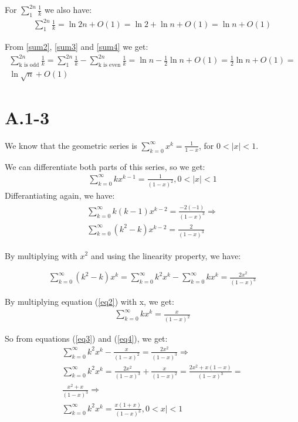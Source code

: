 \documentclass{article}
\begin{document}
For $\sum_{1}^{2n}{\frac{1}{k}}$ we also have:
\begin{gather}
    \sum_{1}^{2n}{\frac{1}{k}} = \ln{2n} + O(1) = \ln{2} + \ln{n} + O(1) = \ln{n} + O(1) \label{sum4}
\end{gather}

From \ref{sum2}, \ref{sum3} and \ref{sum4} we get:
\begin{gather*}
    \sum_{\text{k is odd}}^{2n}{\frac{1}{k}} = \sum_{1}^{2n}{\frac{1}{k}} - \sum_{\text{k is even}}^{2n}{\frac{1}{k}} = \ln{n} - \frac{1}{2}\ln{n} + O(1) = \frac{1}{2}\ln{n} + O(1) =\\
    \ln{\sqrt{n}} + O(1)
\end{gather*}

\section*{A.1-3}
We know that the geometric series is $\sum_{k=0}^{\infty}{x^{k}} = \frac{1}{1 - x}$, for $0 < |x| < 1$.

We can differentiate both parts of this series, so we get:
\begin{gather}
    \sum_{k=0}^{\infty}{kx^{k-1}} = \frac{1}{(1 - x)^2},0< |x| < 1 \label{eq2}
\end{gather}
Differantiating again, we have:
\begin{gather*}
    \begin{align*}
        \sum_{k=0}^{\infty}{k(k-1)x^{k-2}} = \frac{-2(-1)}{(1 - x)^3} \Rightarrow \\
        \sum_{k=0}^{\infty}{(k^{2}-k)x^{k-2}} = \frac{2}{(1-x)^{3}}
    \end{align*}
\end{gather*}

By multiplying with $x^{2}$ and using the linearity property, we have:

\begin{gather}
    \sum_{k=0}^{\infty}{(k^{2}-k)x^{k}} = \sum_{k=0}^{\infty}{k^{2}x^{k}} - \sum_{k=0}^{\infty}{kx^{k}} = \frac{2x^{2}}{(1-x)^{3}} \label{eq3}
\end{gather}

By multiplying equation (\ref{eq2}) with x, we get:
\begin{gather}
    \sum_{k=0}^{\infty}{kx^{k}} = \frac{x}{(1 - x)^2} \label{eq4}
\end{gather}

So from equations (\ref{eq3}) and (\ref{eq4}), we get:
\begin{gather*}
    \sum_{k=0}^{\infty}{k^{2}x^{k}} - \frac{x}{(1 - x)^2} = \frac{2x^{2}}{(1-x)^{3}} \Rightarrow \\
    \sum_{k=0}^{\infty}{k^{2}x^{k}} = \frac{2x^{2}}{(1-x)^{3}} + \frac{x}{(1 - x)^2} = \frac{2x^{2} + x(1-x)}{(1-x)^{3}} = \\
    \frac{x^{2} + x}{(1-x)^{3}} \Rightarrow \\
    \sum_{k=0}^{\infty}{k^{2}x^{k}} = \frac{x(1+x)}{(1-x)^{3}}, 0 < x| < 1
\end{gather*}
\end{document}

